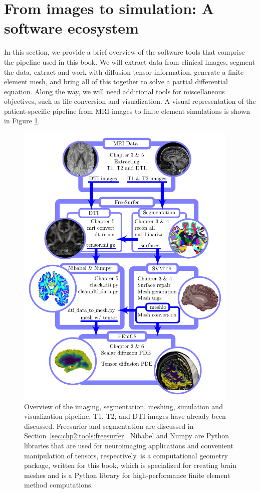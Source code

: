 \section{From images to simulation: A software ecosystem}
\label{sec:chp2:software-ecosystem}
In this section, we provide a brief overview of the software tools that 
comprise the pipeline used in this book. We will extract data from clinical
images, segment the data, extract and work with diffusion tensor
information, generate a finite element mesh, and bring all of this
together to solve a partial differential equation. Along
the way, we will need additional tools for miscellaneous
objectives, such as file conversion and visualization. A visual
representation of the patient-specific pipeline from MRI-images to
finite element simulations is shown in Figure
\ref{fig:chp2:imaging-pipeine-overview}.

\begin{figure}
\centering
 \includegraphics[width=0.95\textwidth]{./graphics/chp2/pipeline-overview.pdf} 
  \caption{Overview of the imaging, segmentation, meshing, simulation
    and visualization pipeline. T1, T2, and DTI images have already
    been discussed.  Freesurfer and segmentation are discussed in
    Section~\ref{sec:chp2:tools:freesurfer}. Nibabel and Numpy are
    Python libraries that are used for neuroimaging applications and
    convenient manipulation of tensors, respectively. {\svmtk} is a
    computational geometry package, written for this book, which is
    specialized for creating brain meshes and {\fenics} is a Python
    library for high-performance finite element method computations.}
  \label{fig:chp2:imaging-pipeine-overview}
\end{figure}

